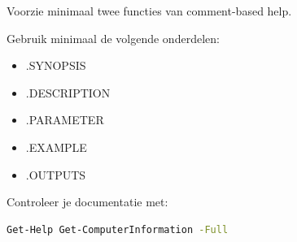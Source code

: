 Voorzie minimaal twee functies van comment-based help.

Gebruik minimaal de volgende onderdelen:
\begin{itemize}
\item .SYNOPSIS
\item .DESCRIPTION
\item .PARAMETER
\item .EXAMPLE
\item .OUTPUTS
\end{itemize}

Controleer je documentatie met:
\begin{lstlisting}[language=bash]
Get-Help Get-ComputerInformation -Full
\end{lstlisting}

